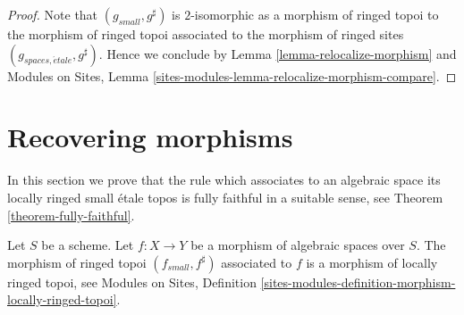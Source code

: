 \begin{proof}
Note that $(g_{small}, g^\sharp)$ is $2$-isomorphic as a
morphism of ringed topoi to the morphism of ringed topoi
associated to the morphism of ringed sites
$(g_{spaces, \acute{e}tale}, g^\sharp)$. Hence we conclude by
Lemma \ref{lemma-relocalize-morphism}
and
Modules on Sites,
Lemma \ref{sites-modules-lemma-relocalize-morphism-compare}.
\end{proof}












\section{Recovering morphisms}
\label{section-morphisms}

\noindent
In this section we prove that the rule which associates to an algebraic space
its locally ringed small \'etale topos is fully faithful in a suitable
sense, see
Theorem \ref{theorem-fully-faithful}.

\begin{lemma}
\label{lemma-morphism-locally-ringed}
Let $S$ be a scheme.
Let $f : X \to Y$ be a morphism of algebraic spaces over $S$.
The morphism of ringed topoi $(f_{small}, f^\sharp)$
associated to $f$ is a morphism of locally ringed topoi, see
Modules on Sites,
Definition \ref{sites-modules-definition-morphism-locally-ringed-topoi}.
\end{lemma}

